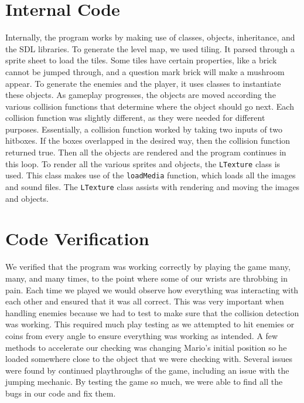 \documentclass[letterpaper]{article}
\begin{document}
\section*{Internal Code}

Internally, the program works by making use of classes, objects, inheritance, and the SDL libraries. To generate the level map, we used tiling. It parsed through a sprite sheet to load the tiles. Some tiles have certain properties, like a brick cannot be jumped through, and a question mark brick will make a mushroom appear. To generate the enemies and the player, it uses classes to instantiate these objects. As gameplay progresses, the objects are moved according the various collision functions that determine where the object should go next. Each collision function was slightly different, as they were needed for different purposes. Essentially, a collision function worked by taking two inputs of two hitboxes. If the boxes overlapped in the desired way, then the collision function returned true. Then all the objects are rendered and the program continues in this loop. To render all the various sprites and objects, the \verb|LTexture| class is used. This class makes use of the \verb|loadMedia| function, which loads all the images and sound files. The \verb|LTexture| class assists with rendering and moving the images and objects.

\section*{Code Verification}

We verified that the program was working correctly by playing the game many, many, and many times, to the point where some of our wrists are throbbing in pain. Each time we played we would observe how everything was interacting with each other and ensured that it was all correct.  This was very important when handling enemies because we had to test to make sure that the collision detection was working.  This required much play testing as we attempted to hit enemies or coins from every angle to ensure everything was working as intended. A few methods to accelerate our checking was changing Mario’s initial position so he loaded somewhere close to the object that we were checking with. Several issues were found by continued playthroughs of the game, including an issue with the jumping mechanic.  By testing the game so much, we were able to find all the bugs in our code and fix them.
\end{document}
